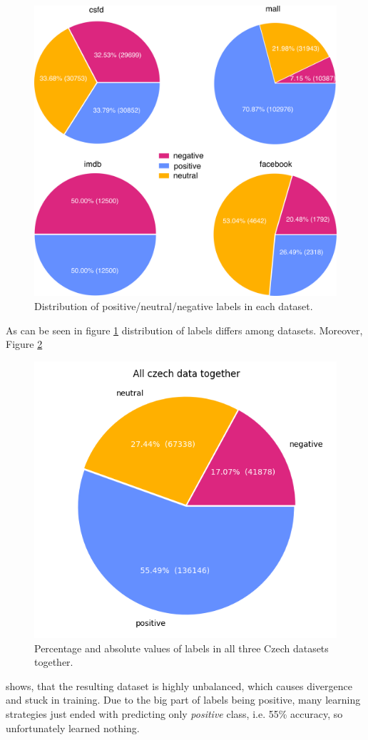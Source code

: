 \begin{figure}[h]
\centering
\includegraphics[width=1\columnwidth]{../img/dist_all.png}
\protect\caption{Distribution of positive/neutral/negative labels in each dataset.}
\label{pic:dist}
\end{figure}

As can be seen in figure \ref{pic:dist}
distribution of labels differs among datasets. Moreover, Figure \ref{pic:dist_all}
\begin{figure}[!ht]
\centering
\includegraphics[width=0.7\columnwidth]{../img/all.png}
\protect\caption{Percentage and absolute values of labels in all three Czech datasets together.}
\label{pic:dist_all}
\end{figure}
shows, that the resulting dataset is highly unbalanced, which causes divergence and stuck in training. Due to the big part of labels being positive, many learning strategies just ended with predicting only \textit{positive} class, i.e. 55\% accuracy, so unfortunately learned nothing. 

